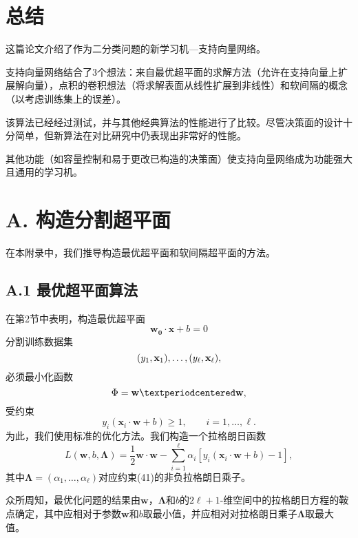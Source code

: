 \documentclass[lang=cn,11pt,a4paper]{elegantpaper}
\begin{document}
	\section{总结}
	这篇论文介绍了作为二分类问题的新学习机—支持向量网络。

	支持向量网络结合了$3$个想法：来自最优超平面的求解方法（允许在支持向量上扩展解向量），点积的卷积想法（将求解表面从线性扩展到非线性）和软间隔的概念（以考虑训练集上的误差）。

	该算法已经经过测试，并与其他经典算法的性能进行了比较。尽管决策面的设计十分简单，但新算法在对比研究中仍表现出非常好的性能。

	其他功能（如容量控制和易于更改已构造的决策面）使支持向量网络成为功能强大且通用的学习机。

	\section*{A. 构造分割超平面}
	在本附录中，我们推导构造最优超平面和软间隔超平面的方法。

	\subsection*{A.1 最优超平面算法}
	在第2节中表明，构造最优超平面
	\begin{equation}
		\mathbf{w_0·x}+b=0\tag{40}
	\end{equation}
	分割训练数据集
	\begin{equation}
		(y_1,\mathbf{x}_1),\ldots,(y_\ell,\mathbf{x}_\ell),\notag
	\end{equation}
	必须最小化函数
	\begin{equation}
		\Phi=\mathbf{w}·\mathbf{w},\notag
	\end{equation}
	受约束
	\begin{equation}
		y_i(\mathbf{x}_i·\mathbf{w}+b)\geq1,\qquad i=1,\ldots,\ell.\tag{41}
	\end{equation}
	为此，我们使用标准的优化方法。我们构造一个拉格朗日函数
	\begin{equation}
		L(\mathbf{w},b,\mathbf{\Lambda})=\frac{1}{2}\mathbf{w}\cdot\mathbf{w}-\sum_{i=1}^\ell\alpha_i[y_i(\mathbf{x}_i\cdot\mathbf{w}+b)-1],\tag{42}
	\end{equation}
	其中$\mathbf{\Lambda}=(\alpha_1,\dots,\alpha_\ell)$对应约束(41)的非负拉格朗日乘子。

	众所周知，最优化问题的结果由$\mathbf{w}$，$\mathbf{\Lambda}$和$b$的$2\ell+1$-维空间中的拉格朗日方程的鞍点确定，其中应相对于参数$\mathbf{w}$和$b$取最小值，并应相对对拉格朗日乘子$\mathbf{\Lambda}$取最大值。
\end{document}
